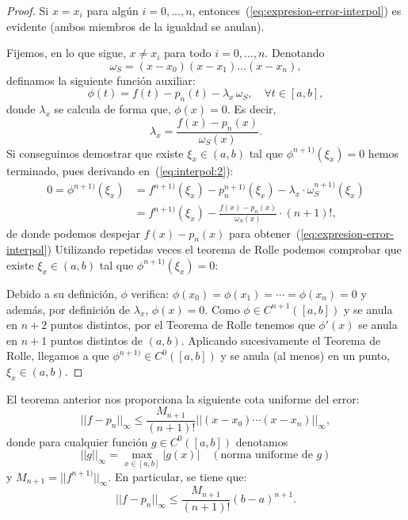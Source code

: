  \begin{proof}
   Si $x=x_i$ para algún $i=0,...,n$,
   entonces~(\ref{eq:expresion-error-interpol}) es evidente (ambos
   miembros de la igualdad se anulan).

   Fijemos, en lo que sigue, $x\neq x_i$ para todo $i=0,...,n$. Denotando
   \begin{equation}
     \omega_S=(x-x_0)(x-x_1)\dots (x-x_n),
     \label{eq:w_S:3} 
   \end{equation}
   definamos la siguiente función auxiliar:
   \begin{equation}
     \phi(t)=f(t)-p_n(t)-\lambda_x\, \omega_S, \quad \forall t\in[a,b],
     \label{eq:interpol:2}
   \end{equation}
   donde $\lambda_x$ se calcula de forma que, $\phi(x)=0$. Es
   decir,
   $$
   \lambda_x = \frac{f(x)-p_n(x)}{\omega_S(x)}.
   $$
   Si conseguimos demostrar que existe $\xi_x\in (a,b)$ tal que
   $\phi^{n+1)}(\xi_x)=0$ hemos terminado, pues derivando
   en~(\ref{eq:interpol:2}):
   \begin{align*}
     0=\phi^{n+1)}(\xi_x)&=f^{n+1)}(\xi_x)-p_n^{n+1)}(\xi_x)-\lambda_x\cdot\omega_S^{n+1)}(\xi_x)
     \\
     &=f^{n+1)}(\xi_x)- \frac{f(x)-p_n(x)}{\omega_S(x)}\cdot (n+1)!,
   \end{align*}
   de donde podemos despejar $f(x)-p_n(x)$ para
   obtener~(\ref{eq:expresion-error-interpol}) 
   Utilizando repetidas veces el teorema de Rolle podemos comprobar que
   existe $\xi_x\in (a,b)$ tal que $\phi^{n+1)}(\xi_x)=0$:

   Debido a su definición, $\phi$ verifica:
   $\phi(x_0)=\phi(x_1)=\cdots=\phi(x_n)=0$ y además, por definición de
   $\lambda_x$, $\phi(x)=0$. Como $\phi\in C^{n+1}([a,b])$ y se anula
   en $n+2$ puntos distintos, por el Teorema de Rolle tenemos que
   $\phi'(x)$ se anula en $n+1$ puntos distintos de $(a,b)$. Aplicando
   sucesivamente el Teorema de Rolle, llegamos a que $\phi^{n+1)}\in
   C^0([a,b])$ y se anula (al menos) en un punto, $\xi_x\in (a,b)$.
 \end{proof}

 \begin{remark}
   \label{rk:2}
   El teorema anterior nos proporciona la siguiente cota uniforme del
   error:
   \begin{equation}
     ||f-p_n||_{\infty} \le \frac{M_{n+1}}{(n+1)!}||(x-x_0)\cdots(x-x_n)||_\infty,
     \label{eq:cota-error-interpol-1}
   \end{equation}
   donde para cualquier función $g\in C^0([a,b])$ denotamos
   \begin{equation*}
     ||g||_\infty = \max_{x\in[a,b]} |g(x)|  \quad (\text{norma
       uniforme de $g$})
   \end{equation*}
   y $M_{n+1}=||f^{n+1)}||_\infty$.  En particular, se tiene que:
   \begin{equation*}
     ||f-p_n||_{\infty} \le \frac{M_{n+1}}{(n+1)!}(b-a)^{n+1}.
     \label{eq:cota-error-interpol-2}
   \end{equation*}
 \end{remark}

